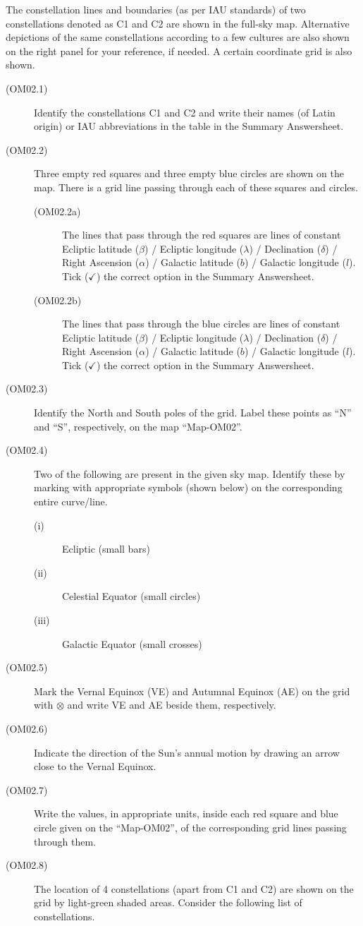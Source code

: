 The constellation lines and boundaries (as per IAU standards) of two
constellations denoted as C1 and C2 are shown in the full-sky map. Alternative
depictions of the same constellations according to a few cultures are also
shown on the right panel for your reference, if needed. A certain coordinate
grid is also shown.


\begin{description}
\item[(OM02.1)] Identify the constellations C1 and C2 and write their names
  (of Latin origin) or IAU abbreviations in the table in the Summary
  Answersheet.
\item[(OM02.2)] Three empty red squares and three empty blue circles are shown
  on the map. There is a grid line passing through each of these squares and
  circles.
  \begin{description}
  \item[(OM02.2a)] The lines that pass through the red squares are lines of
    constant Ecliptic latitude ($\beta$) / Ecliptic longitude ($\lambda$) /
    Declination ($\delta$) / Right Ascension ($\alpha$) / Galactic latitude
    ($b$) / Galactic longitude ($l$). Tick ($\checkmark$) the correct option
    in the Summary Answersheet.
  \item[(OM02.2b)] The lines that pass through the blue circles are lines of
    constant Ecliptic latitude ($\beta$) / Ecliptic longitude ($\lambda$) /
    Declination ($\delta$) / Right Ascension ($\alpha$) / Galactic latitude
    ($b$) / Galactic longitude ($l$). Tick ($\checkmark$) the correct option
    in the Summary Answersheet.
  \end{description}
\item[(OM02.3)] Identify the North and South poles of the grid. Label these
  points as ``N'' and ``S'', respectively, on the map ``Map-OM02''.
\item[(OM02.4)] Two of the following are present in the given sky map.
  Identify these by marking with appropriate symbols (shown below) on the
  corresponding entire curve/line.
  \begin{description}
  \item[(i)] Ecliptic (small bars)
  \item[(ii)] Celestial Equator (small circles)
  \item[(iii)] Galactic Equator (small crosses)
  \end{description}
\item[(OM02.5)] Mark the Vernal Equinox (VE) and Autumnal Equinox (AE) on the
  grid with $\otimes$ and write VE and AE beside them, respectively.
\item[(OM02.6)] Indicate the direction of the Sun's annual motion by drawing
  an arrow close to the Vernal Equinox.
\item[(OM02.7)] Write the values, in appropriate units, inside each red square
  and blue circle given on the ``Map-OM02'', of the corresponding grid lines
  passing through them.
\item[(OM02.8)] The location of 4 constellations (apart from C1 and C2) are
  shown on the grid by light-green shaded areas. Consider the following list
  of constellations.


\end{description}
